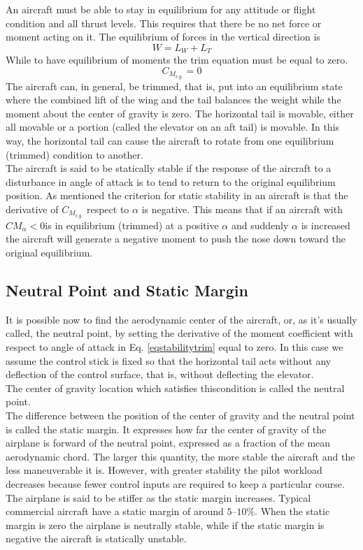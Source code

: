 An aircraft must be able to stay in equilibrium for any attitude or flight condition and all thrust levels. This
requires that there be no net force or moment acting on it. The equilibrium of forces in the vertical direction is
\begin{equation}
W = L_W + L_T
\end{equation}
While to have equilibrium of moments the trim equation must be equal to zero. 
\begin{equation}
C_{M_{c.g.}} = 0
\end{equation}
The aircraft can, in general, be trimmed, that is, put into an equilibrium state where the combined lift of the wing and the tail balances the weight while the moment about the center of gravity is zero. The horizontal tail is movable, either all movable or a portion (called the elevator on an aft tail) is movable. In this way, the horizontal tail can cause the aircraft to rotate from one equilibrium (trimmed) condition to another.\cite{nicolai2010fundamentals}\\
 The aircraft is said to be statically stable if the response of the aircraft to a disturbance in angle of attack is to tend to return to the original equilibrium position.
As mentioned the criterion for static stability in an aircraft is that the derivative of $C_{M_{c.g.}}$ respect to $\alpha$ is negative. This means that if an aircraft with $CM_{\alpha} < 0 $is in equilibrium (trimmed) at a positive $\alpha$ and suddenly $\alpha$ is increased the aircraft will generate a negative moment to push the nose down toward the
original equilibrium.

\subsection{Neutral Point and Static Margin}

It is possible now to find the aerodynamic center of the aircraft, or, as it’s usually called, the neutral point, by setting the derivative of the moment coefficient with respect to angle of attack in Eq. \ref{eqstabilitytrim} equal to zero. In this case we assume the control stick is fixed so that the horizontal tail acts without any deflection of the control surface, that is, without deflecting the elevator.\\ The center of gravity location which satisfies thiscondition is called the neutral point.\\
The difference between the position of the center of gravity and the neutral point is called the static margin. It expresses how far the center of gravity of the airplane is forward of the neutral point, expressed as a fraction of the mean aerodynamic chord. The larger this quantity, the more stable the aircraft and the less maneuverable it is. However, with greater stability the pilot workload decreases because fewer control inputs are required to keep a particular course. The airplane is said to be stiffer as the static margin increases. Typical commercial aircraft have a static margin of around $5–10\%$. When the static margin is zero the  airplane is neutrally stable, while if the static margin is negative the aircraft is statically unstable.

